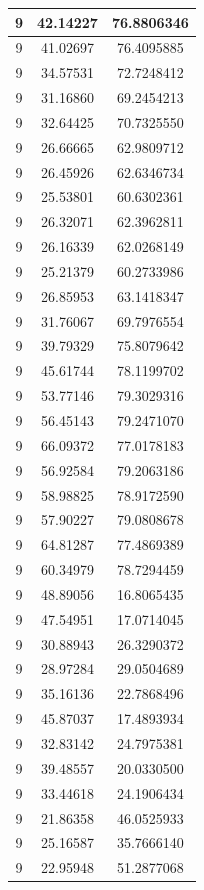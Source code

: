 \documentclass[
]{book}
\begin{document}
\begin{tabular}{c|c|c}
\hline
9 & 42.14227 & 76.8806346\\
\hline
9 & 41.02697 & 76.4095885\\
\hline
9 & 34.57531 & 72.7248412\\
\hline
9 & 31.16860 & 69.2454213\\
\hline
9 & 32.64425 & 70.7325550\\
\hline
9 & 26.66665 & 62.9809712\\
\hline
9 & 26.45926 & 62.6346734\\
\hline
9 & 25.53801 & 60.6302361\\
\hline
9 & 26.32071 & 62.3962811\\
\hline
9 & 26.16339 & 62.0268149\\
\hline
9 & 25.21379 & 60.2733986\\
\hline
9 & 26.85953 & 63.1418347\\
\hline
9 & 31.76067 & 69.7976554\\
\hline
9 & 39.79329 & 75.8079642\\
\hline
9 & 45.61744 & 78.1199702\\
\hline
9 & 53.77146 & 79.3029316\\
\hline
9 & 56.45143 & 79.2471070\\
\hline
9 & 66.09372 & 77.0178183\\
\hline
9 & 56.92584 & 79.2063186\\
\hline
9 & 58.98825 & 78.9172590\\
\hline
9 & 57.90227 & 79.0808678\\
\hline
9 & 64.81287 & 77.4869389\\
\hline
9 & 60.34979 & 78.7294459\\
\hline
9 & 48.89056 & 16.8065435\\
\hline
9 & 47.54951 & 17.0714045\\
\hline
9 & 30.88943 & 26.3290372\\
\hline
9 & 28.97284 & 29.0504689\\
\hline
9 & 35.16136 & 22.7868496\\
\hline
9 & 45.87037 & 17.4893934\\
\hline
9 & 32.83142 & 24.7975381\\
\hline
9 & 39.48557 & 20.0330500\\
\hline
9 & 33.44618 & 24.1906434\\
\hline
9 & 21.86358 & 46.0525933\\
\hline
9 & 25.16587 & 35.7666140\\
\hline
9 & 22.95948 & 51.2877068\\

\end{tabular}
\end{document}
